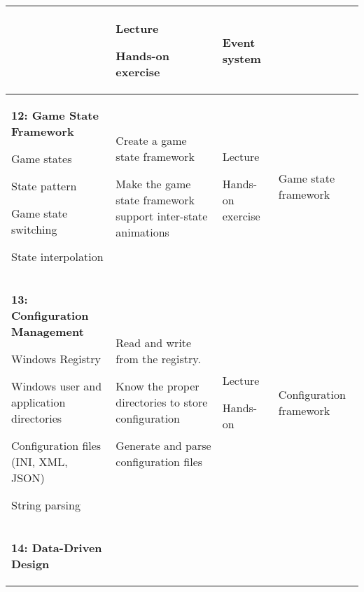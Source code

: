 \documentclass[10pt]{article}
\newenvironment{itemize*}{
\begin{itemize}[leftmargin=1em,noitemsep,nolistsep]
}{\end{itemize}}
\begin{document}
\begin{longtable}{||p{1.8in}|p{2.4in}|p{1.3in}|p{1in}||}
\begin{itemize*}
	\end{itemize*} &
	\begin{itemize*}
		\item Lecture
		\item Hands-on exercise
	\end{itemize*} & Event system\\ \hline
\textbf{12: Game State Framework}
	\begin{itemize*}
		\item Game states
		\item State pattern
		\item Game state switching
		\item State interpolation
	\end{itemize*}&
	\begin{itemize*}
		\item Create a game state framework
		\item Make the game state framework support inter-state animations
	\end{itemize*} &
	\begin{itemize*}
		\item Lecture
		\item Hands-on exercise
	\end{itemize*} & Game state framework \\ \hline
\textbf{13: Configuration Management}
	\begin{itemize*}
		\item Windows Registry
		\item Windows user and application directories
		\item Configuration files (INI, XML, JSON)
		\item String parsing
	\end{itemize*} &
	\begin{itemize*}
		\item Read and write from the registry.
		\item Know the proper directories to store configuration
		\item Generate and parse configuration files
	\end{itemize*} &
	\begin{itemize*}
		\item Lecture
		\item Hands-on
	\end{itemize*} & Configuration framework \\ \hline
\textbf{14: Data-Driven Design}
	\begin{itemize*}

\end{itemize*}
\end{longtable}
\end{document}
